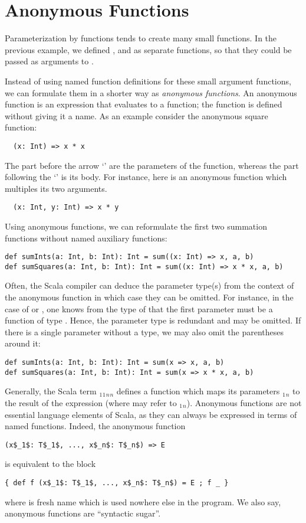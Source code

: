 \section{Anonymous Functions}

Parameterization by functions tends to create many small functions. In
the previous example, we defined ,  and
 as separate functions, so that they could be 
passed as arguments to .

Instead of using named function definitions for these small argument
functions, we can formulate them in a shorter way as {\em anonymous
functions}. An anonymous function is an expression that evaluates to a
function; the function is defined without giving it a name. As an
example consider the anonymous square function:
\begin{lstlisting}
  (x: Int) => x * x
\end{lstlisting}
The part before the arrow `\code{=>}' are the parameters of the function,
whereas the part following the `\code{=>}' is its body. 
For instance, here is an anonymous function which multiples its two arguments.
\begin{lstlisting}
  (x: Int, y: Int) => x * y
\end{lstlisting}
Using anonymous functions, we can reformulate the first two summation
functions without named auxiliary functions:
\begin{lstlisting}
def sumInts(a: Int, b: Int): Int = sum((x: Int) => x, a, b)
def sumSquares(a: Int, b: Int): Int = sum((x: Int) => x * x, a, b)
\end{lstlisting}
Often, the Scala compiler can deduce the parameter type(s) from the
context of the anonymous function in which case they can be omitted.
For instance, in the case of  or , one
knows from the type of  that the first parameter must be a
function of type .  Hence, the parameter type
 is redundant and may be omitted. If there is a single
parameter without a type, we may also omit the parentheses around it:
\begin{lstlisting}
def sumInts(a: Int, b: Int): Int = sum(x => x, a, b)
def sumSquares(a: Int, b: Int): Int = sum(x => x * x, a, b)
\end{lstlisting}

Generally, the Scala term
$_1$$_1$$_n$$_n$ 
defines a function which maps its parameters
$_1$$_n$ to the result of the expression 
(where  may refer to $_1$$_n$).  Anonymous
functions are not essential language elements of Scala, as they can
always be expressed in terms of named functions. Indeed, the 
anonymous function
\begin{lstlisting}
(x$_1$: T$_1$, ..., x$_n$: T$_n$) => E
\end{lstlisting}
is equivalent to the block
\begin{lstlisting}
{ def f (x$_1$: T$_1$, ..., x$_n$: T$_n$) = E ; f _ }
\end{lstlisting}
where  is fresh name which is used nowhere else in the program.
We also say, anonymous functions are ``syntactic sugar''.

